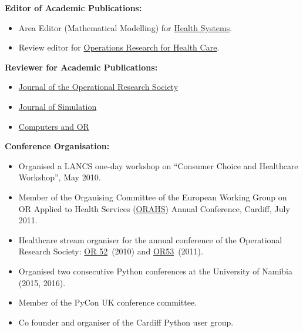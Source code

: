 \documentclass[10pt]{res} %
\begin{document}
\begin{resume}
\begin{center}
\textbf{Editor of Academic Publications:}
\end{center}

\begin{itemize}
\itemsep1pt\parskip0pt
\item
  Area Editor (Mathematical Modelling) for \href{http://www.palgrave-journals.com/hs/index.html}{Health Systems}.
\item
  Review editor for \href{http://www.elsevier.com/wps/find/journaldescription.cws_home/726198/description\#description}{Operations Research for Health Care}.
\end{itemize}

\begin{center}
\textbf{Reviewer for Academic Publications:}
\end{center}

\begin{itemize}
\itemsep1pt\parskip0pt
\item
  \href{http://www.palgrave-journals.com/jors/index.html}{Journal of the Operational Research Society}
\item
  \href{http://www.palgrave-journals.com/jos/index.html}{Journal of Simulation}
\item
  \href{http://www.elsevier.com/wps/find/journaldescription.cws_home/300/description\#description}{Computers and OR}
\end{itemize}

\begin{center}
\textbf{Conference Organisation:}
\end{center}

\begin{itemize}
\itemsep1pt\parskip0pt
\item
  Organised a LANCS one-day workshop on ``Consumer Choice and Healthcare Workshop'', May 2010.
\item
  Member of the Organising Committee of the European Working Group on OR Applied to Health Services (\href{http://www.orahs2011.com}{ORAHS}) Annual Conference, Cardiff, July 2011.
\item
  Healthcare stream organiser for the annual conference of the Operational Research Society:
  \href{http://www.orsoc.org.uk/orshop/(stzuo2ebygs4f145rklamu55)/orcontent.aspx?inc=or52_main.htm}{OR 52}~(2010) and \href{http://www.orsoc.org.uk/orshop/(0gufsl451p5fhmnkztaameeh)/orcontent.aspx?inc=or53_main.htm}{OR53}~(2011).
\item
  Organised two consecutive Python conferences at the University of Namibia
  (2015, 2016).
\item
  Member of the PyCon UK conference committee.
\item
  Co founder and organiser of the Cardiff Python user group.
\end{itemize}



\end{resume}
\end{document}
